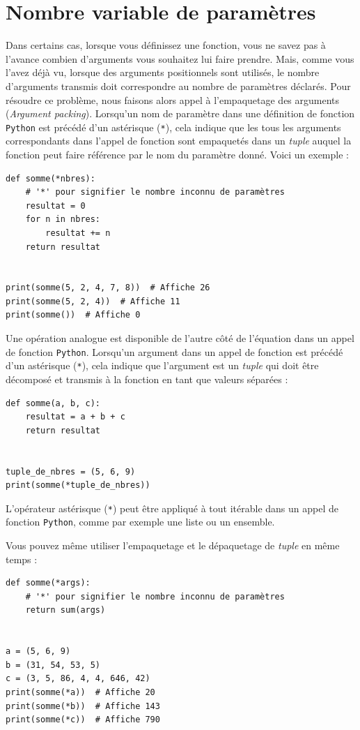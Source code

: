 \documentclass[a4paper,12pt]{book}
\begin{document}
\section{Nombre variable de paramètres}
Dans certains cas, lorsque vous définissez une fonction, vous ne savez pas à l'avance combien d'arguments vous souhaitez lui faire prendre. Mais, comme vous l'avez déjà vu, lorsque des arguments positionnels sont utilisés, le nombre d'arguments transmis doit correspondre au nombre de paramètres déclarés. Pour résoudre ce problème, nous faisons alors appel à l'empaquetage des arguments (\og \textit{Argument packing}\fg{}). Lorsqu'un nom de paramètre dans une définition de fonction \texttt{Python} est précédé d'un astérisque (\texttt{*}), cela indique que les tous les arguments correspondants dans l'appel de fonction sont empaquetés dans un \textit{tuple} auquel la fonction peut faire référence par le nom du paramètre donné. Voici un exemple :
\begin{lstlisting}[caption=Nombre de paramètres non connu]
def somme(*nbres):  
    # '*' pour signifier le nombre inconnu de paramètres
    resultat = 0
    for n in nbres:
        resultat += n
    return resultat
  
  
print(somme(5, 2, 4, 7, 8))  # Affiche 26
print(somme(5, 2, 4))  # Affiche 11
print(somme())  # Affiche 0
\end{lstlisting}
\medskip

Une opération analogue est disponible de l'autre côté de l'équation dans un appel de fonction \texttt{Python}. Lorsqu'un argument dans un appel de fonction est précédé d'un astérisque (\texttt{*}), cela indique que l'argument est un \textit{tuple} qui doit être décomposé et transmis à la fonction en tant que valeurs séparées :
\begin{lstlisting}[caption=Décomposition de \textit{tuple}]
def somme(a, b, c):
    resultat = a + b + c
    return resultat


tuple_de_nbres = (5, 6, 9)
print(somme(*tuple_de_nbres))
\end{lstlisting}
\medskip

L'opérateur astérisque (\texttt{*}) peut être appliqué à tout itérable dans un appel de fonction \texttt{Python}, comme par exemple une liste ou un ensemble.
\medskip

Vous pouvez même utiliser l'empaquetage et le dépaquetage de \textit{tuple} en même temps :
\begin{lstlisting}[caption=Empaquetage et dépaquetage]
def somme(*args):
    # '*' pour signifier le nombre inconnu de paramètres
    return sum(args)


a = (5, 6, 9)
b = (31, 54, 53, 5)
c = (3, 5, 86, 4, 4, 646, 42)
print(somme(*a))  # Affiche 20
print(somme(*b))  # Affiche 143
print(somme(*c))  # Affiche 790
\end{lstlisting}
\medskip
\end{document}
